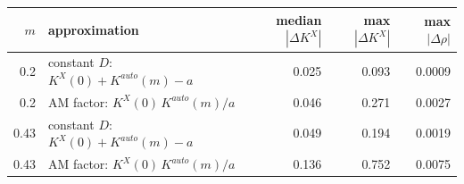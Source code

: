 \begin{tabular}{rl|rr|r}\toprule
$m$ & approximation & median $|\Delta K^X|$ & max $|\Delta K^X|$ & max $|\Delta\rho|$\\\midrule
0.2 & constant $D$: $K^X(0)+K^{auto}(m)-a$ & 0.025 & 0.093 & 0.0009 \\
0.2 & AM factor: $K^X(0)\,K^{auto}(m)/a$ & 0.046 & 0.271 & 0.0027 \\
0.43 & constant $D$: $K^X(0)+K^{auto}(m)-a$ & 0.049 & 0.194 & 0.0019 \\
0.43 & AM factor: $K^X(0)\,K^{auto}(m)/a$ & 0.136 & 0.752 & 0.0075 \\
\bottomrule\end{tabular}
